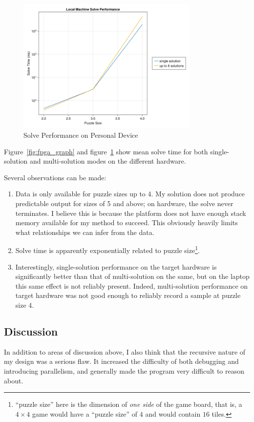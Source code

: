\documentclass[11pt]{article}
\begin{document}
\begin{figure}[h]
  \centering
  \includegraphics[width=0.8\textwidth]{host_perf}
  \caption{Solve Performance on Personal Device}
  \label{fig:laptop_graph}
\end{figure}


Figure~\ref{fig:fpga_graph} and figure~\ref{fig:laptop_graph} show mean solve time for both single-solution and multi-solution modes on the different hardware.

Several observations can be made:

\begin{enumerate}
  \item Data is only available for puzzle sizes up to 4.
    My solution does not produce predictable output for sizes of 5 and above; on hardware, the solve never terminates.
    I believe this is because the platform does not have enough stack memory available for my method to succeed.
    This obviously heavily limits what relationships we can infer from the data.
  \item Solve time is apparently exponentially related to puzzle size\footnote{``puzzle size'' here is the dimension of \textit{one side} of the game board, that is, a $4 \times 4$ game would have a ``puzzle size'' of $4$ and would contain $16$ tiles.}.
  \item Interestingly, single-solution performance on the target hardware is significantly better than that of multi-solution on the same, but on the laptop this same effect is not reliably present.
    Indeed, multi-solution performance on target hardware was not good enough to reliably record a sample at puzzle size 4.
\end{enumerate}

\subsection{Discussion}

In addition to areas of discussion above, I also think that the recursive nature of my design was a serious flaw.
It increased the difficulty of both debugging and introducing parallelism, and generally made the program very difficult to reason about.

\end{document}
